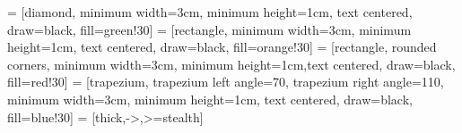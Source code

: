 {%




}

\usepackage{graphicx} %
\usepackage{booktabs} %
\usepackage{enumitem}
\usepackage{tikz}
\usetikzlibrary{shapes.geometric, arrows}
\usetikzlibrary{mindmap, backgrounds}

 = [diamond, minimum width=3cm, minimum height=1cm, text centered, draw=black, fill=green!30]
 = [rectangle, minimum width=3cm, minimum height=1cm, text centered, draw=black, fill=orange!30]
 = [rectangle, rounded corners, minimum width=3cm, minimum height=1cm,text centered, draw=black, fill=red!30]
 = [trapezium, trapezium left angle=70, trapezium right angle=110, minimum width=3cm, minimum height=1cm, text centered, draw=black, fill=blue!30]
 = [thick,->,>=stealth]

